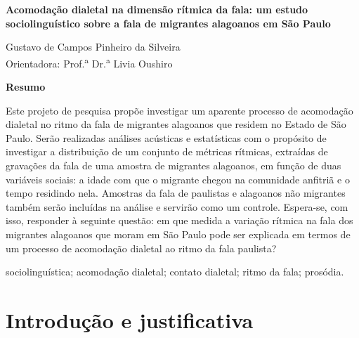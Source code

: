 \documentclass[
		a4paper,	%
		12pt,		%
		]{article}	%
\begin{document}
		
	{ %
		\begin{center} {\bfseries\Large\sffamily Acomodação dialetal na dimensão
				rítmica da fala: um estudo sociolinguístico sobre a fala de
				migrantes alagoanos em São Paulo } \end{center} }
		
	\vspace{0.35em}

	{ %

		\begin{flushright} 
			Gustavo de Campos Pinheiro da Silveira \\ 
			\vspace{5pt}
			Orientadora: Prof.\textsuperscript{a} Dr.\textsuperscript{a} Livia Oushiro
		\end{flushright}

		\begin{center} 
			{\bfseries\sffamily Resumo} \\ 
		\end{center}
			Este projeto de pesquisa propõe investigar um aparente processo de
			acomodação dialetal no ritmo da fala de migrantes alagoanos que
			residem no Estado de São Paulo. Serão realizadas análises acústicas
			e estatísticas com o propósito de investigar a distribuição de um
			conjunto de métricas rítmicas, extraídas de gravações da fala de uma
			amostra de migrantes alagoanos, em função de duas variáveis sociais:
			a idade com que o migrante chegou na comunidade anfitriã e o tempo
			residindo nela. Amostras da fala de paulistas e alagoanos não
			migrantes também serão incluídas na análise e servirão como um
			controle. Espera-se, com isso, responder à seguinte questão: em que
			medida a variação rítmica na fala dos migrantes alagoanos que moram
			em São Paulo pode ser explicada em termos de um processo de
			acomodação dialetal ao ritmo da fala paulista?
		\par
		\vspace{1.35em}
		 sociolinguística; acomodação dialetal;
			contato dialetal; ritmo da fala; prosódia.
			
	}

	\section{Introdução e justificativa} 
	\label{intro}
		
\end{document}
